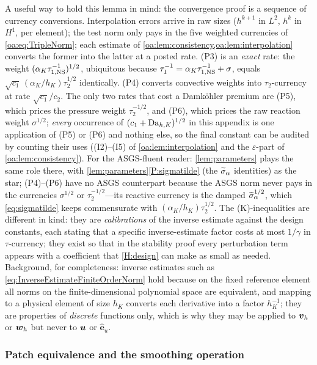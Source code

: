 \begin{pedagogy}
A useful way to hold this lemma in mind: the convergence proof is a sequence of
currency conversions. Interpolation errors arrive in raw sizes ($h^{k+1}$ in
$L^2$, $h^{k}$ in $H^1$, per element); the test norm only pays in the five
weighted currencies of \cref{oa:eq:TripleNorm}; each estimate of
\cref{oa:lem:consistency,oa:lem:interpolation} converts the former into the
latter at a posted rate. (P3) is an \emph{exact} rate: the weight
$(\alpha_K\tau_{1,\mathrm{NS}}^{-1})^{1/2}$, ubiquitous because
$\tau_1^{-1} = \alpha_K\tau_{1,\mathrm{NS}}^{-1}+\sigma$, equals
$\sqrt{c_1}\,(\alpha_K/h_K)\tau_2^{1/2}$ identically. (P4) converts convective
weights into $\tau_2$-currency at rate $\sqrt{c_1}/c_2$. The only two rates that
cost a Damk\"ohler premium are (P5), which prices the pressure weight
$\tau_2^{-1/2}$, and (P6), which prices the raw reaction weight $\sigma^{1/2}$;
\emph{every} occurrence of $(c_1+\mathrm{Da}_{h,K})^{1/2}$ in this appendix is one
application of (P5) or (P6) and nothing else, so the final constant can be
audited by counting their uses ((I2)--(I5) of \cref{oa:lem:interpolation} and
the $\varepsilon$-part of \cref{oa:lem:consistency}). For the ASGS-fluent
reader: \cref{lem:parameters} plays the same role there, with
\cref{lem:parameters}\ref{P:sigmatilde} (the $\widetilde{\sigma}_{\alpha}$ identities) as the
star; (P4)--(P6) have no ASGS counterpart because the ASGS norm never pays in
the currencies $\sigma^{1/2}$ or $\tau_2^{-1/2}$---its reactive currency is the
damped $\widetilde{\sigma}_{\alpha}^{1/2}$, which \cref{eq:sigmatilde} keeps commensurate with
$(\alpha_K/h_K)\tau_2^{1/2}$. The (K)-inequalities are different in kind: they
are \emph{calibrations} of the inverse estimate against the design constants,
each stating that a specific inverse-estimate factor costs at most $1/\gamma$
in $\tau$-currency; they exist so that in the stability proof every
perturbation term appears with a coefficient that \cref{H:design} can make as
small as needed. Background, for completeness: inverse estimates such as
\cref{eq:InverseEstimateFiniteOrderNorm} hold because on the fixed reference
element all norms on the finite-dimensional polynomial space are equivalent,
and mapping to a physical element of size $h_K$ converts each derivative into a
factor $h_K^{-1}$; they are properties of \emph{discrete} functions only, which
is why they may be applied to $\boldsymbol{v}_h$ or $\boldsymbol{w}_h$ but never to $\boldsymbol{u}$ or
$\hat{\boldsymbol e}_u$.
\end{pedagogy}

\subsubsection{Patch equivalence and the smoothing operation}

